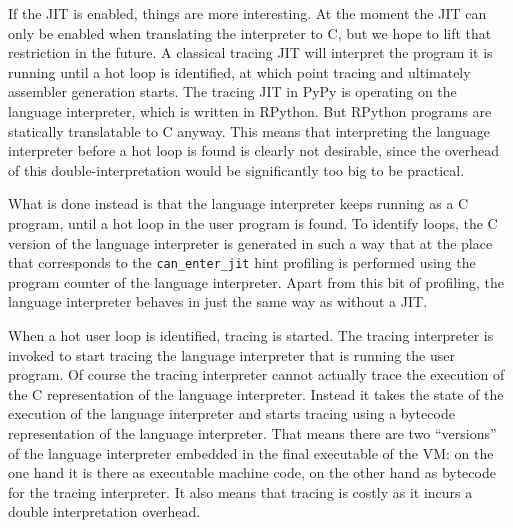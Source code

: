 \documentclass{sig-alternate}
\begin{document}
If the JIT is enabled, things are more interesting. At the moment the JIT can
only be enabled when translating the interpreter to C, but we hope to lift that
restriction in the future. A classical tracing JIT will
interpret the program it is running until a hot loop is identified, at which
point tracing and ultimately assembler generation starts. The tracing JIT in
PyPy is operating on the language interpreter, which is written in RPython. But
RPython programs are statically translatable to C anyway. This means that interpreting the
language interpreter before a hot loop is found is clearly not desirable,
since the overhead of this double-interpretation would be significantly too big
to be practical.

What is done instead is that the language interpreter keeps running as a C
program, until a hot loop in the user program is found. To identify loops, the
C version of the language interpreter is generated in such a way that at the
place that corresponds to the \texttt{can\_enter\_jit} hint profiling is
performed using the program counter of the language interpreter. Apart from this
bit of profiling, the language interpreter behaves in just the same way as
without a JIT.

When a hot user loop is identified, tracing is started. The
tracing interpreter is invoked to start tracing the language interpreter that is
running the user program. Of course the tracing interpreter cannot actually
trace the execution of the C representation of the language interpreter. Instead
it takes the state of the execution of the language interpreter and starts
tracing using a bytecode representation of the language interpreter. That means
there are two ``versions'' of the language interpreter embedded in the final
executable of the VM: on the one hand it is there as executable machine code, on
the other hand as bytecode for the tracing interpreter. It also means that
tracing is costly as it incurs a double interpretation overhead.
\end{document}
